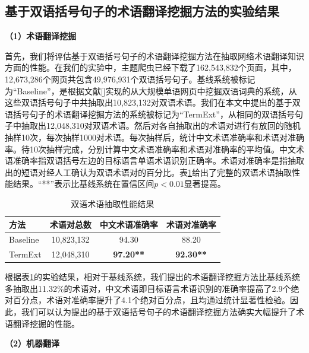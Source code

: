 \subsection{基于双语括号句子的术语翻译挖掘方法的实验结果}

\textbf{（1）术语翻译挖掘}

首先，我们将评估基于双语括号句子的术语翻译挖掘方法在抽取网络术语翻译知识方面的性能。在我们的实验中，主题爬虫已经下载了162,543,832个页面，其中，12,673,286个网页共包含49,976,931个双语括号句子。基线系统被标记为“Baseline”，是根据文献[\cite{Cao:2007}]实现的从大规模单语网页中挖掘双语词典的系统，从这些双语括号句子中共抽取出10,823,132对双语术语。我们在本文中提出的基于双语括号句子的术语翻译挖掘方法的系统被标记为“TermExt”，从相同的双语括号句子中抽取出12,048,310对双语术语。然后对各自抽取出的术语对进行有放回的随机抽样10次，每次抽样1000对术语。每次抽样后，统计中文术语准确率和术语对准确率。待10次抽样完成，分别计算中文术语准确率和术语对准确率的平均值。中文术语准确率指双语括号左边的目标语言单语术语识别正确率。术语对准确率是指抽取出的短语对经人工确认为双语术语对的百分比。表\ref{Table_bilingual_term_extract_result}给出了完整的双语术语抽取性能结果。“**”表示比基线系统在置信区间$p<0.01$显著提高。

\begin{table}[!htbp]
	\centering
	\begin{tabular}{|l|c|c|c|}
		\hline
		方法  & 术语对总数 & 中文术语准确率 & 术语对准确率 \\ 
		\hline
		Baseline         & 10,823,132 &	94.30 &	88.20 \\ \hline
		TermExt	         & 12,048,310 &	\textbf{97.20**} &	\textbf{92.30**} \\
		\hline
	\end{tabular}
	\caption{双语术语抽取性能结果}
	\label{Table_bilingual_term_extract_result}
\end{table}

根据表\ref{Table_bilingual_term_extract_result}的实验结果，相对于基线系统，我们提出的术语翻译挖掘方法比基线系统多抽取出11.32\%的术语对，中文术语即目标语言术语识别的准确率提高了2.9个绝对百分点，术语对准确率提升了4.1个绝对百分点，且均通过统计显著性检验。因此，我们可以认为提出的基于双语括号句子的术语翻译挖掘方法确实大幅提升了术语翻译挖掘的性能。

\textbf{（2）机器翻译}

